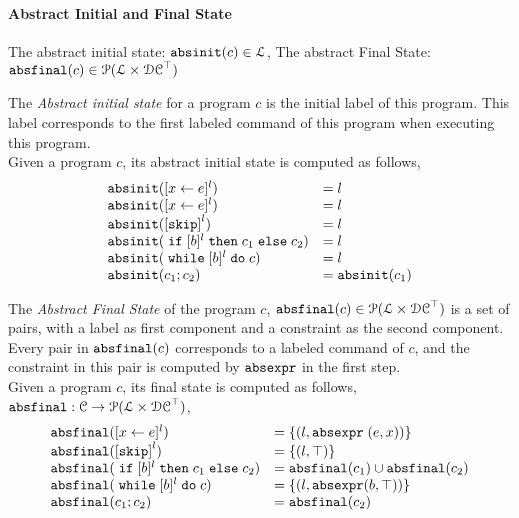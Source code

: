 \paragraph{Abstract Initial and Final State}
%
The abstract initial state: $\mathtt{abs}{\mathtt{init}}(c) \in \mathcal{L}$,
The abstract Final State: $\mathtt{abs}{\mathtt{final}}(c) \in \mathcal{P}(\mathcal{L} \times \mathcal{DC}^{\top})$

The \emph{Abstract initial state} for a program $c$ is the initial label of this program.
This label corresponds to the first labeled command of this program 
when executing this program.
\\
Given a program $c$, its abstract initial state is computed as follows,
%
\[
  \begin{array}{ll}
    \absinit(\clabel{\assign{x}{\expr}}{}^l)  & = l  \\
    \absinit(\clabel{\assign{x}{\expr}}{}^l)  & = l \\
    \absinit(\clabel{\eskip}^{l})  & = l \\
    \absinit(\eif [b]^l \ethen c_1 \eelse c_2)  & = l \\
    \absinit(\ewhile [b]^l \edo c)  & = l \\
    \absinit(c_1 ; c_2)  & = \absinit(c_1) \\
 \end{array}
 \]
%

The \emph{Abstract Final State} of the program $c$, 
$\mathtt{abs}{\mathtt{final}}(c) \in \mathcal{P}(\mathcal{L} \times \mathcal{DC}^{\top})$
is a set of pairs, with a label as first component and a constraint as the second component.
Every pair in $\mathtt{abs}{\mathtt{final}}(c)$ corresponds to a labeled command of $c$,
and the constraint in this pair is computed by $\mathtt{abs}{\mathtt{expr}}$ in the first step.
\\
Given a program $c$, its final state is computed as follows,
$\mathtt{abs}{\mathtt{final}}: \mathcal{C} \to \mathcal{P}(\mathcal{L} \times \mathcal{DC}^{\top})$,
 \[
  \begin{array}{ll}
    \absfinal(\clabel{\assign{x}{\expr}}{}^l)  & = \{(l, \absexpr\eapp (\expr, x))\}  \\
     \absfinal(\clabel{\eskip}^{l})  
     & = \{(l, \top)\} \\
     \absfinal(\eif [b]^l \ethen c_1 \eelse c_2)  & = \absfinal(c_1) \cup \absfinal(c_2) \\
     \absfinal(\ewhile [b]^l \edo c)  & = \{(l, \absexpr(\bexpr, \top))\} \\
     \absfinal(c_1 ; c_2)  & =  \absfinal(c_2) \\
 \end{array}
 \]
